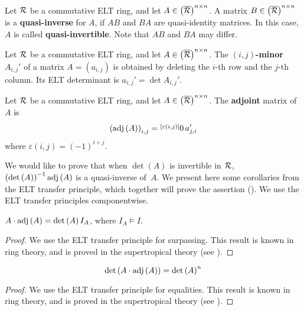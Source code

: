 \begin{defn}
Let $\R$ be a commutative ELT ring, and let $A\in \left(\overline{\R}\right)^{n\times n}$. A matrix $B\in \left(\overline{\R}\right)^{n\times n}$ is a \textbf{quasi-inverse} for $A$, if $AB$ and $BA$ are quasi-identity matrices. In this case, $A$ is called \textbf{quasi-invertible}. Note that $AB$ and $BA$ may differ.
\end{defn}

\begin{defn}
Let $\R$ be a commutative ELT ring, and let $A\in \left(\overline{\R}\right)^{n\times n}$. The \textbf{$\left(i,j\right)$-minor} $A_{i,j}'$ of a matrix $A=\left(a_{i,j}\right)$ is obtained by deleting the $i$-th row and the $j$-th column. Its ELT determinant is $a_{i,j}'=\det A_{i,j}'$.
\end{defn}

\begin{defn}
Let $\R$ be a commutative ELT ring, and let $A\in \left(\overline{\R}\right)^{n\times n}$. The \textbf{adjoint} matrix of $A$ is
$$\left(\adj\left(A\right)\right)_{i,j}=\layer 0{\varepsilon\left(i,j\right)}\, a_{j,i}'$$
where $\varepsilon\left(i,j\right)=\left(-1\right)^{i+j}$.
\end{defn}

We would like to prove that when $\det\left(A\right)$ is invertible in $\R$, $\left(\det \left(A\right)\right)^{-1}\adj\left(A\right)$ is a quasi-inverse of~$A$. We present here some corollaries from the ELT transfer principle, which together will prove the assertion (). We use the ELT transfer principles componentwise.

\begin{cor}\label{cor:A-times-adj}
$A\cdot\adj\left(A\right)=\det\left(A\right)I_{A}$, where $I_{A}\vDash I$.
\end{cor}
\begin{proof}
We use the ELT transfer principle for surpassing. This result is known in ring theory, and is proved in the supertropical theory (see \cite[Remark 4.5]{IR3}).
\end{proof}

\begin{cor}\label{cor:det-of-A-times-adj}
$$\det\left(A\cdot\adj\left(A\right)\right)=\det\left(A\right)^n$$
\end{cor}
\begin{proof}
We use the ELT transfer principle for equalities. This result is known in ring theory, and is proved in the supertropical theory (see \cite[Theorem~4.9]{IR3}).
\end{proof}

